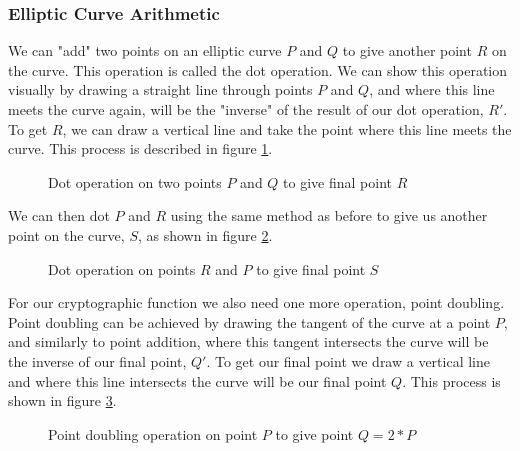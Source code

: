 \subsubsection{Elliptic Curve Arithmetic}
We can "add" two points on an elliptic curve $P$ and $Q$ to give another point $R$ on the curve. This operation is called the dot operation. We can show this operation visually by drawing a straight line through points $P$ and $Q$, and where this line meets the curve again, will be the "inverse" of the result of our dot operation, $R'$. To get $R$, we can draw a vertical line and take the point where this line meets the curve. This process is described in figure \ref{fig:ECCdot}.
\begin{figure}[!htb]
\centering
\resizebox{5cm}{!}{}
\caption{Dot operation on two points $P$ and $Q$ to give final point $R$}
\label{fig:ECCdot}
\end{figure}
We can then dot $P$ and $R$ using the same method as before to give us another point on the curve, $S$, as shown in figure \ref{fig:ECCdot2}.
\begin{figure}[!htb]
\centering
\resizebox{5cm}{!}{}
\caption{Dot operation on points $R$ and $P$ to give final point $S$}
\label{fig:ECCdot2}
\end{figure}
For our cryptographic function we also need one more operation, point doubling. Point doubling can be achieved by drawing the tangent of the curve at a point $P$, and similarly to point addition, where this tangent intersects the curve will be the inverse of our final point, $Q'$. To get our final point we draw a vertical line and where this line intersects the curve will be our final point $Q$. This process is shown in figure \ref{fig:ECCdbl}.
\begin{figure}[!htb]
\centering
\resizebox{5cm}{!}{}
\caption{Point doubling operation on point $P$ to give point $Q = 2*P$}
\label{fig:ECCdbl}
\end{figure}
